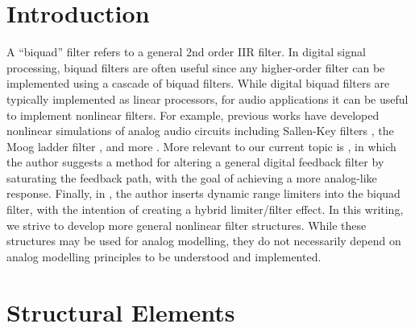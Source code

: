 \documentclass[twoside,a4paper]{article}
\title{\papertitle}
\affiliation{
\paperauthorA \, \thanks{\vspace{-3mm}}}
{\href{http://ccrma.stanford.edu}{Center for Computer Research in Music and Acoustics} \\ Stanford University \\ Palo Alto, CA \\ {\tt \href{mailto:jatin@ccrma.stanford.edu}{jatin@ccrma.stanford.edu}}}
\newif\ifpdf
\begin{document}
\ifpdf %
  \DeclareGraphicsExtensions{.png,.jpg,.pdf}
\else  %
\fi

\maketitle

\begin{abstract}
Biquad filters are a common tool for filter design. In this
writing, we develop two structures for creating biquad filters
with nonlinear elements. We provide conditions for the guaranteed
stability of the nonlinear filters, and derive expressions for
instantaneous pole analysis. Finally, we examine example filters
built with these nonlinear structures, and show how the first
nonlinear structure can be used in the context of analog modelling.
\end{abstract}

\section{Introduction}
A ``biquad'' filter refers to a general 2nd order IIR filter.
In digital signal processing, biquad filters are often useful
since any higher-order filter can be implemented using a cascade
of biquad filters. While digital biquad filters are typically implemented
as linear processors, for audio applications it can be useful to
implement nonlinear filters. For example, previous works have developed
nonlinear simulations of analog audio circuits including Sallen-Key
filters \cite{SKF,wdfSallenKey}, the Moog ladder filter
\cite{AnttiMoog,AnttiOsc,Vadim}, and more \cite{dafxVA}. More relevant
to our current topic is \cite{Rossum1992MakingDF}, in which the author
suggests a method for altering a general digital feedback filter
by saturating the feedback path, with the goal of achieving a more
analog-like response. Finally, in \cite{BiquadLimiter}, the author
inserts dynamic range limiters into the biquad filter, with the
intention of creating a hybrid limiter/filter effect. In this writing,
we strive to develop more general nonlinear filter structures.
While these structures may be used for analog modelling, they do
not necessarily depend on analog modelling principles to be
understood and implemented.

\section{Structural Elements}
\end{document}
